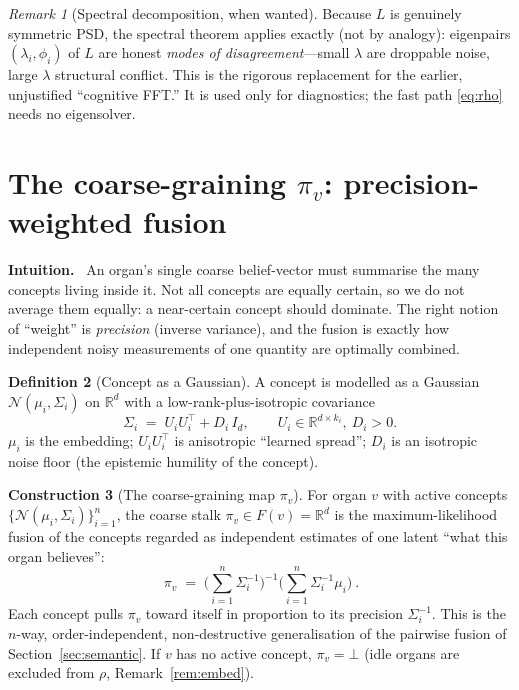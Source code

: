 \documentclass[11pt]{article}
\theoremstyle{definition}
\newtheorem{definition}{Definition}[section]
\newtheorem{construction}[definition]{Construction}
\theoremstyle{plain}
\theoremstyle{remark}
\newtheorem{remark}[definition]{Remark}
\newcommand{\Intu}{\noindent\textbf{\color{intuitioncol}Intuition.}\ }
\newcommand{\Fs}{F}                 %
\newcommand{\R}{\mathbb{R}}
\newcommand{\Rd}{\mathbb{R}^{d}}
\begin{document}
\begin{remark}[Spectral decomposition, when wanted]
Because $L$ is genuinely symmetric PSD, the spectral theorem applies exactly (not by
analogy): eigenpairs $(\lambda_i,\phi_i)$ of $L$ are honest \emph{modes of
disagreement}---small $\lambda$ are droppable noise, large $\lambda$ structural
conflict. This is the rigorous replacement for the earlier, unjustified ``cognitive
FFT.'' It is used only for diagnostics; the fast path \eqref{eq:rho} needs no
eigensolver.
\end{remark}

\section{The coarse-graining \texorpdfstring{$\pi_v$}{pi_v}: precision-weighted fusion}\label{sec:piv}

\begin{intu}\Intu
An organ's single coarse belief-vector must summarise the many concepts living inside
it. Not all concepts are equally certain, so we do not average them equally: a
near-certain concept should dominate. The right notion of ``weight'' is
\emph{precision} (inverse variance), and the fusion is exactly how independent noisy
measurements of one quantity are optimally combined.
\end{intu}

\begin{definition}[Concept as a Gaussian]\label{def:concept-gauss}
A concept is modelled as a Gaussian $\mathcal N(\mu_i,\Sigma_i)$ on $\Rd$ with a
low-rank-plus-isotropic covariance
\begin{equation}\label{eq:cov}
\Sigma_i \;=\; U_iU_i^{\top} + D_i\,I_d,\qquad U_i\in\R^{d\times k_i},\ D_i>0 .
\end{equation}
$\mu_i$ is the embedding; $U_iU_i^\top$ is anisotropic ``learned spread''; $D_i$ is an
isotropic noise floor (the epistemic humility of the concept).
\end{definition}

\begin{construction}[The coarse-graining map $\pi_v$]\label{con:piv}
For organ $v$ with active concepts $\{\mathcal N(\mu_i,\Sigma_i)\}_{i=1}^{n}$, the
coarse stalk $\pi_v\in\Fs(v)=\Rd$ is the maximum-likelihood fusion of the concepts
regarded as independent estimates of one latent ``what this organ believes'':
\begin{equation}\label{eq:piv}
\boxed{\ \pi_v \;=\;\Big(\textstyle\sum_{i=1}^{n}\Sigma_i^{-1}\Big)^{-1}
\Big(\textstyle\sum_{i=1}^{n}\Sigma_i^{-1}\mu_i\Big)\ }.
\end{equation}
Each concept pulls $\pi_v$ toward itself in proportion to its precision
$\Sigma_i^{-1}$. This is the $n$-way, order-independent, non-destructive
generalisation of the pairwise fusion of Section~\ref{sec:semantic}. If $v$ has no
active concept, $\pi_v=\bot$ (idle organs are excluded from $\rho$,
Remark~\ref{rem:embed}).
\end{construction}
\end{document}
